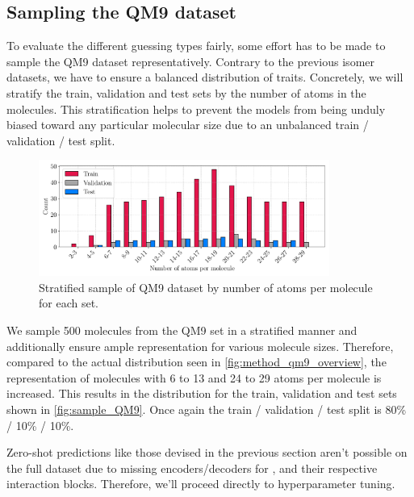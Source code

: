 \subsection{Sampling the QM9 dataset}
\label{sec:qm9_full_isomers_sampling}
To evaluate the different guessing types fairly, some effort has to be made to sample the QM9 dataset representatively. Contrary to the previous isomer datasets, we have to ensure a balanced distribution of traits. Concretely, we will stratify the train, validation and test sets by the number of atoms in the molecules. This stratification helps to prevent the models from being unduly biased toward any particular molecular size due to an unbalanced train / validation / test split.
\begin{figure}[H]
    \centering
    \includegraphics[width=0.85\textwidth]{../fig/application/strat_sample.pdf}
    \caption[Stratified sample of QM9 dataset]{Stratified sample of QM9 dataset by number of atoms per molecule for each set.}
    \label{fig:sample_QM9}
\end{figure}
We sample 500 molecules from the QM9 set in a stratified manner and additionally ensure ample representation for various molecule sizes. Therefore, compared to the actual distribution seen in \autoref{fig:method_qm9_overview}, the representation of molecules with 6 to 13 and 24 to 29 atoms per molecule is increased. This results in the distribution for the train, validation and test sets shown in \autoref{fig:sample_QM9}. Once again the train / validation / test split is 80\% / 10\% / 10\%.

Zero-shot predictions like those devised in the previous section aren't possible on the full dataset due to missing encoders/decoders for ,  and their respective interaction blocks. Therefore, we'll proceed directly to hyperparameter tuning. 
